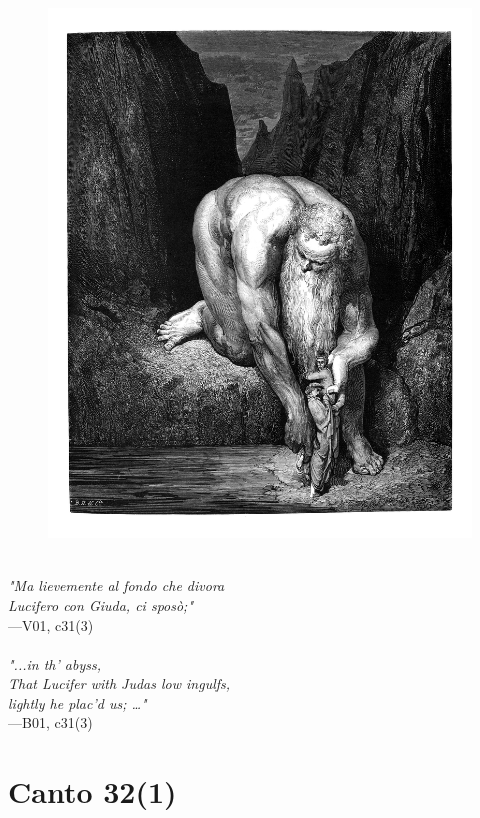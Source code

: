 \documentclass[../Dore_vision.tex]{subfiles}
\begin{document}
\begin{figure}[ht]
\centering
\includegraphics[height=\figsize]{illustrations/book_1/V01, c31(3).jpg}
\end{figure}

\begin{center}
\begin{minipage}{0.8\linewidth}
\textit{\\
"Ma lievemente al fondo che divora\\Lucifero con Giuda, ci spos\`o;"} \\
—V01, c31(3) \\~\\
\textit{"...in th' abyss,\\That Lucifer with Judas low ingulfs,\\lightly he plac'd us; …"} \\
—B01, c31(3)
\end{minipage}
\end{center}

\newpage

\section{Canto 32(1)}
\end{document}
